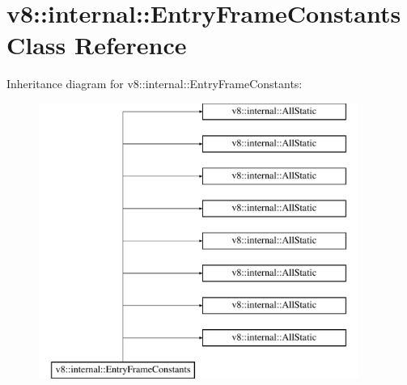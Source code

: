 \hypertarget{classv8_1_1internal_1_1EntryFrameConstants}{}\section{v8\+:\+:internal\+:\+:Entry\+Frame\+Constants Class Reference}
\label{classv8_1_1internal_1_1EntryFrameConstants}
Inheritance diagram for v8\+:\+:internal\+:\+:Entry\+Frame\+Constants\+:\begin{figure}[H]
\begin{center}
\leavevmode
\includegraphics[height=9.000000cm]{classv8_1_1internal_1_1EntryFrameConstants}
\end{center}
\end{figure}
